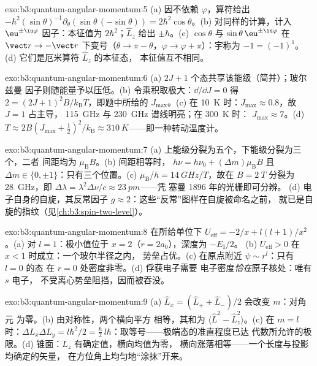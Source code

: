 \begin{solution}{exo:b3:quantum-angular-momentum:5}
(a) 因不依赖 $\varphi$，算符给出
$-\hbar^2(\sin\theta)^{-1}\partial_\theta(\sin\theta\,(-\sin\theta))
= 2\hbar^2\cos\theta$。(b) 对同样的计算，计入
$\eu^{\pm\iu\varphi}$ 因子：本征值为 $2\hbar^2$；$\hat L_z$
给出 $\pm\hbar$。(c) $\cos\theta$ 与 $\sin\theta\,\eu^{\pm\iu
\varphi}$ 在 $\vect r \to -\vect r$ 下变号（$\theta \to \pi
- \theta$，$\varphi \to \varphi + \pi$）：宇称为 $-1 = (-1)^1$。(d)
它们是厄米算符 $\hat L_z$ 的本征态，
本征值互不相同。
\end{solution}

\begin{solution}{exo:b3:quantum-angular-momentum:6}
(a) $2J + 1$ 个态共享该能级（简并）；玻尔兹曼
因子则随能量予以压低。(b) 令乘积取极大：$\dd/\dd J = 0$
得 $2 = (2J+1)^2B/k_{\text{B}}T$，即题中所给的 $J_{\max}$。(c) 在
\qty{10}{K} 时：$J_{\max} \approx 0.8$，故 $J = 1$ 占主导，
\qty{115}{GHz} 与 \qty{230}{GHz} 谱线明亮；在 \qty{300}{K} 时：
$J_{\max} \approx 7$。(d) $T \approx 2B(J_{\max} + \tfrac12)^2/
k_{\text{B}} \approx \qty{310}{K}$——即一种转动温度计。
\end{solution}

\begin{solution}{exo:b3:quantum-angular-momentum:7}
(a) 上能级分裂为五个，下能级分裂为三个，二者
间距均为 $\mu_{\text{B}}B$。(b) 间距相等时，
$h\nu = h\nu_0 + (\Delta m)\mu_{\text{B}}B$ 且 $\Delta m \in \{0,
\pm1\}$：只有三个位置。(c) $\mu_{\text{B}}/h = \qty{14}{GHz/T}$，故在 $B = \qty{2}{T}$
分裂为 \qty{28}{GHz}，即 $\Delta\lambda =
\lambda^2\Delta\nu/c \approx \qty{23}{pm}$——凭
塞曼 1896 年的光栅即可分辨。
(d) 电子自身的自旋，其反常因子 $g \approx
2$：这些“反常”图样在自旋被命名之前，
就已是自旋的指纹（见\cref{ch:b3:spin-two-level}）。
\end{solution}

\begin{solution}{exo:b3:quantum-angular-momentum:8}
在所给单位下 $U_{\text{eff}} = -2/x + l(l+1)/x^2$。(a) 对
$l = 1$：极小值位于 $x = 2$（$r = 2a_0$），深度为 $-E_{\text{I}}/2$。
(b) $U_{\text{eff}} > 0$ 在 $x < 1$ 时成立：一个玻尔半径之内，
势垒占优。(c) 在原点附近 $\psi \sim r^l$：只有 $l = 0$ 的态
在 $r = 0$ 处密度非零。(d) 俘获电子需要
电子密度\emph{恰在}原子核处：唯有 $s$ 电子，
不受离心势垒阻挡，因而被吞没。
\end{solution}

\begin{solution}{exo:b3:quantum-angular-momentum:9}
(a) $\hat L_x = (\hat L_+ + \hat L_-)/2$ 会改变 $m$：对角元
为零。(b) 由对称性，两个横向平方
相等，其和为 $\langle\hat L^2 - \hat L_z^2\rangle$。(c)
在 $m = l$ 时：$\Delta L_x\Delta L_y = l\hbar^2/2 = \tfrac\hbar2
\,l\hbar$：取等号——极端态的准直程度已达
代数所允许的极限。(d) 锥面：$L_z$ 有确定值，横向均值为零，
横向涨落相等——一个长度与投影均确定的矢量，
在方位角上均匀地“涂抹”开来。
\end{solution}

